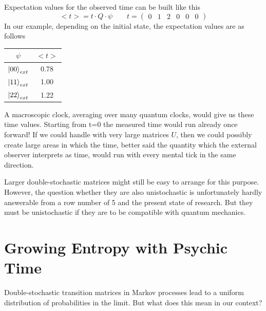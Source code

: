 \documentclass[12pt]{article}
\begin{document}
Expectation values for the observed time can be built like this
\begin{equation*}
<t> = t \cdot Q \cdot \psi \quad\quad t = \begin{pmatrix}
0&1&2&0&0&0
\end{pmatrix}
\end{equation*}
In our example, depending on the initial state, the expectation values are as follows
\begin{center}
\begin{tabular}{ |c|c| } 
 \hline
 $\psi$ & $<t>$ \\ 
 \hline
 $\ket{00}_{ext}$ & 0.78 \\ 
 $\ket{11}_{ext}$ & 1.00 \\ 
 $\ket{22}_{ext}$ & 1.22 \\
 \hline
\end{tabular}
\end{center}
A macroscopic clock, averaging over many quantum clocks, would give us these time values. Starting from t=0 the measured time would run already once forward! If we could handle with very large matrices $U$, then we could possibly create large areas in which the time, better said the quantity which the external observer interprets as time, would run with every mental tick in the same direction.

Larger double-stochastic matrices might still be easy to arrange for this purpose. However, the question whether they are also unistochastic is unfortunately hardly answerable from a row number of 5 and the present state of research. But they must be unistochastic if they are to be compatible with quantum mechanics.

\section{Growing Entropy with Psychic Time}

Double-stochastic transition matrices in Markov processes lead to a uniform distribution of probabilities in the limit. But what does this mean in our context?

\end{document}
